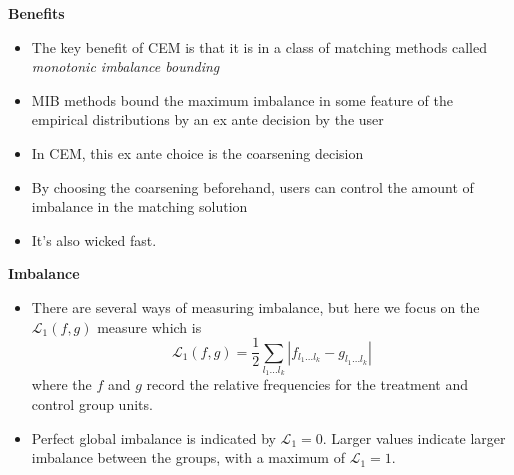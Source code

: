 \documentclass[notes=show]{beamer}
\begin{document}
\begin{frame}[plain]
	\begin{center}
	\textbf{Benefits}
	\end{center}
	
	\begin{itemize}
	\item The key benefit of CEM is that it is in a class of matching methods called \emph{monotonic imbalance bounding}
	\item MIB methods bound the maximum imbalance in some feature of the empirical distributions by an ex ante decision by the user
	\item In CEM, this ex ante choice is the coarsening decision
	\item By choosing the coarsening beforehand, users can control the amount of imbalance in the matching solution
	\item It's also wicked fast.
	\end{itemize}
\end{frame}


\begin{frame}[plain]
	\begin{center}
	\textbf{Imbalance}
	\end{center}
	
	\begin{itemize}
	\item There are several ways of measuring imbalance, but here we focus on the $\mathcal{L}_1(f,g)$ measure which is$$\mathcal{L}_1(f,g) = \frac{1}{2} \sum_{l_1 \dots l_k} | f_{l_1 \dots l_k} - g_{l_1 \dots l_k} |$$where the $f$ and $g$ record the relative frequencies for the treatment and control group units.
	\item Perfect global imbalance is indicated by $\mathcal{L}_1=0$.  Larger values indicate larger imbalance between the groups, with a maximum of $\mathcal{L}_1=1$. 
	\end{itemize}
\end{frame}
\end{document}
